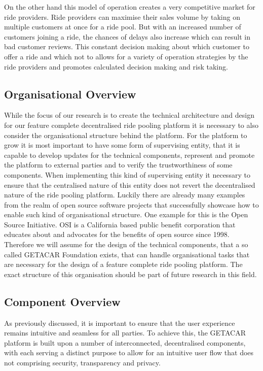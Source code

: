 On the other hand this model of operation creates a very competitive market for ride providers. Ride providers can maximise their sales volume by taking on multiple customers at once for a ride pool. But with an increased number of customers joining a ride, the chances of delays also increase which can result in bad customer reviews. This constant decision making about which customer to offer a ride and which not to allows for a variety of operation strategies by the ride providers and promotes calculated decision making and risk taking. 

\subsection{Organisational Overview}
While the focus of our research is to create the technical architecture and design for our feature complete decentralised ride pooling platform it is necessary to also consider the organisational structure behind the platform. For the platform to grow it is most important to have some form of supervising entity, that it is capable to develop updates for the technical components, represent and promote the platform to external parties and to verify the trustworthiness of some components. When implementing this kind of supervising entity it necessary to ensure that the centralised nature of this entity does not revert the decentralised nature of the ride pooling platform. Luckily there are already many examples from the realm of open source software projects that successfully showcase how to enable such kind of organisational structure. One example for  this is the Open Source Initiative. OSI is a California based public benefit corporation that educates about and advocates for the benefits of open source since 1998. Therefore we will assume for the design of the technical components, that a so called GETACAR Foundation exists, that can handle organisational tasks that are necessary for the design of a feature complete ride pooling platform. The exact structure of this organisation should be part of future research in this field.

\subsection{Component Overview}
As previously discussed, it is important to ensure that the user experience remains intuitive and seamless for all parties. To achieve this, the GETACAR platform is built upon a number of interconnected, decentralised components, with each serving a distinct purpose to allow for an intuitive user flow that does not comprising security, transparency and privacy.

